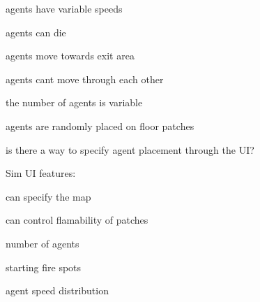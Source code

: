 \documentclass[12pt,letterpaper]{article}
\begin{document}
    agents have variable speeds

    agents can die

    agents move towards exit area

    agents cant move through each other

    the number of agents is variable

    agents are randomly placed on floor patches

    is there a way to specify agent placement through the UI?

Sim UI features:

    can specify the map

    can control flamability of patches

    number of agents

    starting fire spots

    agent speed distribution


\end{document}

